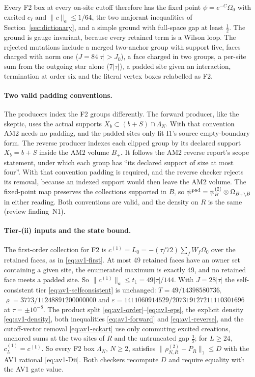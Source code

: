 Every F2 box at every on-site cutoff therefore has the fixed point
$\psi=e^{-C}\Omega_0$ with excited $c_I$ and $\lVert c\rVert_a\le1/64$, the two
majorant inequalities of Section~\ref{sec:dictionary}, and a simple ground
with full-space gap at least $\tfrac12$. The ground is gauge invariant,
because every retained term is a Wilson loop. The rejected mutations include
a merged two-anchor group with support five, faces charged with norm one
($J=84|\tau|>J_0$), a face charged in two groups, a per-site sum from the
outgoing star alone ($7|\tau|$), a padded site given an interaction,
termination at order six and the literal vertex boxes relabelled as F2.

\paragraph{Two valid padding conventions.}
The producers index the F2 groups differently. The forward producer, like
the skeptic, uses the actual supports $X_b\subset(b+S)\cap\Lambda_N$. With
that convention AM2 needs no padding, and the padded sites only fit I1's
source empty-boundary form. The reverse producer indexes each clipped group
by its declared support $X_b=b+S$ inside the AM2 volume $B_+$. It follows the
AM2 reverse report's scope statement, under which each group has ``its
declared support of size at most four''. With that convention padding is
required, and the reverse checker rejects its removal, because an indexed
support would then leave the AM2 volume. The fixed-point map preserves the
collections supported in $B$, so
$\psi^{\rm pad}=\psi^{(2)}_B\otimes\Omega_{B_+\setminus B}$ in either reading.
Both conventions are valid, and the density on $R$ is the same (review
finding~N1).

\paragraph{Tier-(ii) inputs and the state bound.}
The first-order collection for F2 is $c^{(1)}=L_0=-(\tau/72)\sum_fW_f\Omega_0$
over the retained faces, as in \eqref{eq:av1-first}. At most 49 retained faces
have an owner set containing a given site, the enumerated maximum is exactly
49, and no retained face meets a padded site. So
$\lVert c^{(1)}\rVert_a\le t_1=49|\tau|/144$. With $J=28|\tau|$ the self-consistent
tier \eqref{eq:av1-selfconsistent} is unchanged: $T=49/14398580736$,
$\varrho=3773/11248891200000000$ and
$\varepsilon=1411060914529/207319127211110301696$ at $\tau=\pm10^{-8}$. The
product split \eqref{eq:av1-order}--\eqref{eq:av1-eps}, the explicit density
\eqref{eq:av1-density}, both inequalities \eqref{eq:av1-forward} and
\eqref{eq:av1-reverse}, and the cutoff-vector removal \eqref{eq:av1-eckart}
use only commuting excited creations, anchored sums at the two sites of $R$
and the untruncated gap $\tfrac12$; for $L\ge24$, $c^{(1)}_L=c^{(1)}$. So every
F2 box $\Lambda_N$, $N\ge2$, satisfies $\lVert \rho^{(2)}_{N,R}-P_R\rVert_1\le D$
with the AV1 rational \eqref{eq:av1-Dii}. Both checkers recompute $D$ and
require equality with the AV1 gate value.

